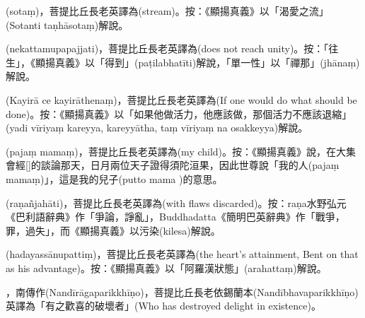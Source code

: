\startitemgroup[noteitems]
\item{}(sotaṃ)，菩提比丘長老英譯為(stream)。按：《顯揚真義》以「渴愛之流」(Sotanti taṇhāsotaṃ)解說。
\stopitemgroup

\startitemgroup[noteitems]
\item{}(nekattamupapajjati)，菩提比丘長老英譯為(does not reach unity)。按：「往生」，《顯揚真義》以「得到」(paṭilabhatīti)解說，「單一性」以「禪那」(jhānaṃ)解說。
\stopitemgroup

\startitemgroup[noteitems]
\item{}(Kayirā ce kayirāthenaṃ)，菩提比丘長老英譯為(If one would do what should be done)。按：《顯揚真義》以「如果他做活力，他應該做，那個活力不應該退縮」(yadi vīriyaṃ kareyya, kareyyātha, taṃ vīriyaṃ na osakkeyya)解說。
\stopitemgroup

\startitemgroup[noteitems]
\item{}(pajaṃ mamaṃ)，菩提比丘長老英譯為(my child)。按：《顯揚真義》說，在大集會經[]的談論那天，日月兩位天子證得須陀洹果，因此世尊說「我的人(pajaṃ mamaṃ)」，這是我的兒子(putto mama )的意思。
\stopitemgroup

\startitemgroup[noteitems]
\item{}(raṇañjahāti)，菩提比丘長老英譯為(with flaws discarded)。按：raṇa水野弘元《巴利語辭典》作「爭論，諍亂」，Buddhadatta《簡明巴英辭典》作「戰爭，罪，過失」，而《顯揚真義》以污染(kilesa)解說。
\stopitemgroup

\startitemgroup[noteitems]
\item{}(hadayassānupattiṃ)，菩提比丘長老英譯為(the heart's attainment, Bent on that as his advantage)。按：《顯揚真義》以「阿羅漢狀態」(arahattaṃ)解說。
\stopitemgroup

\startitemgroup[noteitems]
\item{}，南傳作(Nandīrāgaparikkhīṇo)，菩提比丘長老依錫蘭本(Nandībhavaparikkhīṇo)英譯為「有之歡喜的破壞者」(Who has destroyed delight in existence)。
\stopitemgroup

